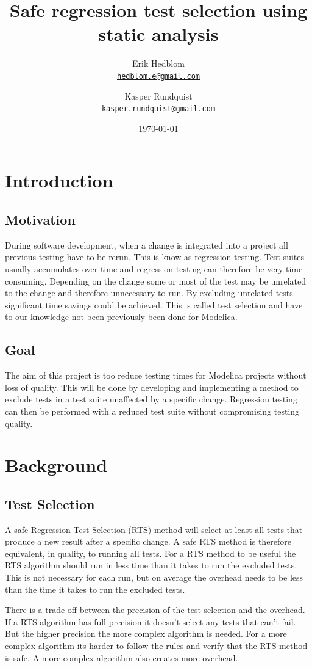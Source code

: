 \documentclass{cslthse-msc}
\author{
	Erik Hedblom \\
	{\normalsize \href{mailto:hedblom.e@gmail.com}{\texttt{hedblom.e@gmail.com}}}
	\and
	Kasper Rundquist \\
	{\normalsize \href{mailto:kasper.rundquist@gmail.com}{\texttt{kasper.rundquist@gmail.com}}}
}
\title{Safe regression test selection using static analysis}
\date{\today}
\begin{document}
\makefrontmatter
\chapter[Introduction]{Introduction}

\section{Motivation}
During software development, when a change is integrated into a project all previous testing have to be rerun. This is know as regression testing. Test suites usually accumulates over time and regression testing can therefore be very time consuming. Depending on the change some or most of the test may be unrelated to the change and therefore unnecessary to run. By excluding unrelated tests significant time savings could be achieved. This is called test selection and have to our knowledge not been previously been done for Modelica. 


\section{Goal}

The aim of this project is too reduce testing times for Modelica projects without loss of quality. This will be done by developing and implementing a method to exclude tests in a test suite unaffected by a specific change. Regression testing can then be performed with a reduced test suite without compromising testing quality.


\chapter[Background]{Background}
\section{Test Selection}
A safe Regression Test Selection (RTS) method will select at least all tests that produce a new result after a specific change. A safe RTS method is therefore equivalent, in quality, to running all tests. For a RTS method to be useful the RTS algorithm should run in less time than it takes to run the excluded tests. This is not necessary for each run, but on average the overhead needs to be less than the time it takes to run the excluded tests.

There is a trade-off between the precision of the test selection and the overhead. If a RTS algorithm has full precision it doesn't select any tests that can't fail. But the higher precision the more complex algorithm is needed. For a more complex algorithm its harder to follow the rules and verify that the RTS method is safe. A more complex algorithm also creates more overhead.
\end{document}
